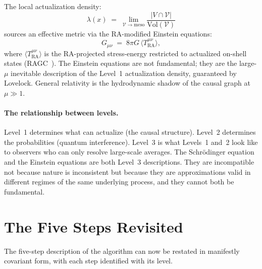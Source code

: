 \documentclass[11pt,a4paper]{article}
\theoremstyle{plain}
\theoremstyle{definition}
\theoremstyle{remark}
\newcommand{\Tact}{T^{\mu\nu}_{\mathrm{RA}}}
\begin{document}
The local actualization density:
\begin{equation}
  \lambda(x) \;=\; \lim_{\mathcal{V} \to \mathrm{meso}}
  \frac{|V \cap \mathcal{V}|}{\mathrm{Vol}(\mathcal{V})}
  \label{eq:lambda_density_v2}
\end{equation}
sources an effective metric via the RA-modified Einstein equations:
\begin{equation}
  G_{\mu\nu} \;=\; 8\pi G\,\langle\Tact\rangle,
  \label{eq:ra_efe}
\end{equation}
where $\langle\Tact\rangle$ is the RA-projected stress-energy restricted to
actualized on-shell states (RAGC~\citep{Sandeman2026b}). The Einstein equations are not fundamental; they are the
large-$\mu$ inevitable description of the Level~1 actualization
density, guaranteed by Lovelock. General relativity is the
hydrodynamic shadow of the causal graph at $\mu \gg 1$.

\paragraph{The relationship between levels.}
Level~1 determines what can actualize (the causal structure). Level~2
determines the probabilities (quantum interference). Level~3 is what Levels~1
and~2 look like to observers who can only resolve large-scale averages. The
Schr\"{o}dinger equation and the Einstein equations are both Level~3
descriptions. They are incompatible not because nature is inconsistent but
because they are approximations valid in different regimes of the same
underlying process, and they cannot both be fundamental.

\section{The Five Steps Revisited}
\label{sec:fivesteps}

The five-step description of the algorithm can now be restated in manifestly
covariant form, with each step identified with its level.
\end{document}
